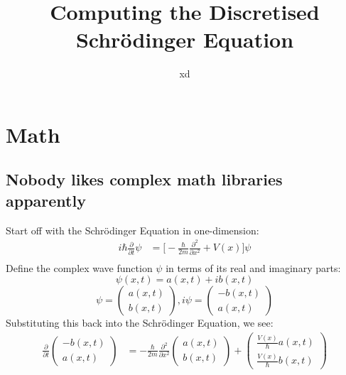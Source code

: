 \documentclass[11pt,letterpaper]{article}
\begin{document}
	\setlength{\parindent}{0pt}
	\setlength{\parskip}{1em}
	\title{Computing the Discretised Schr{\"o}dinger Equation}
	\author{xd}
	\maketitle

	\section{Math}
	\subsection{Nobody likes complex math libraries apparently}
	Start off with the Schr{\"o}dinger Equation in one-dimension:
	\begin{align*}
		i \hbar \frac{\partial}{\partial t} \psi &= \Big[-\frac{\hbar}{2m}\frac{\partial^2}{\partial x^2} + V(x)\Big] \psi \\
	\end{align*}
	Define the complex wave function $\psi$ in terms of its real and imaginary parts:
		\[\psi(x,t) = a(x,t)+ib(x,t)\]
		\[\psi =
		\begin{pmatrix}
			a(x,t) \\
			b(x,t)
		\end{pmatrix},
		i\psi = 
		\begin{pmatrix}
			-b(x,t)\\
			a(x,t)
		\end{pmatrix}\]
	Substituting this back into the Schr{\"o}dinger Equation, we see:
	\begin{align*}
		\frac{\partial}{\partial t} 
		\begin{pmatrix}
			-b(x,t)\\
			a(x,t)
		\end{pmatrix} &= 
		-\frac{\hbar}{2m}\frac{\partial^2}{\partial x^2}
		\begin{pmatrix}
			a(x,t)\\
			b(x,t)
		\end{pmatrix}
		+
		\begin{pmatrix}
			\frac{V(x)}{\hbar} a(x,t)\\
			\frac{V(x)}{\hbar} b(x,t)
		\end{pmatrix}
	\end{align*}
\end{document}
